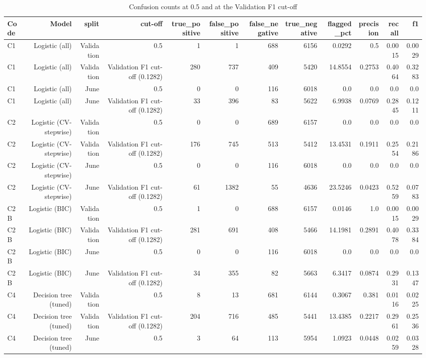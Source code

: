 \begin{table}[htbp]
\centering
\small
\caption{Confusion counts at 0.5 and at the Validation F1 cut-off}
\begin{tabular}{lrrrrrrrrrrr}
\toprule
Code & Model & split & cut-off & true\_positive & false\_positive & false\_negative & true\_negative & flagged\_pct & precision & recall & f1 \\
\midrule
C1 & Logistic (all) & Validation & 0.5 & 1 & 1 & 688 & 6156 & 0.0292 & 0.5 & 0.0015 & 0.0029 \\
C1 & Logistic (all) & Validation & Validation F1 cut-off (0.1282) & 280 & 737 & 409 & 5420 & 14.8554 & 0.2753 & 0.4064 & 0.3283 \\
C1 & Logistic (all) & June & 0.5 & 0 & 0 & 116 & 6018 & 0.0 & 0.0 & 0.0 & 0.0 \\
C1 & Logistic (all) & June & Validation F1 cut-off (0.1282) & 33 & 396 & 83 & 5622 & 6.9938 & 0.0769 & 0.2845 & 0.1211 \\
C2 & Logistic (CV-stepwise) & Validation & 0.5 & 0 & 0 & 689 & 6157 & 0.0 & 0.0 & 0.0 & 0.0 \\
C2 & Logistic (CV-stepwise) & Validation & Validation F1 cut-off (0.1282) & 176 & 745 & 513 & 5412 & 13.4531 & 0.1911 & 0.2554 & 0.2186 \\
C2 & Logistic (CV-stepwise) & June & 0.5 & 0 & 0 & 116 & 6018 & 0.0 & 0.0 & 0.0 & 0.0 \\
C2 & Logistic (CV-stepwise) & June & Validation F1 cut-off (0.1282) & 61 & 1382 & 55 & 4636 & 23.5246 & 0.0423 & 0.5259 & 0.0783 \\
C2B & Logistic (BIC) & Validation & 0.5 & 1 & 0 & 688 & 6157 & 0.0146 & 1.0 & 0.0015 & 0.0029 \\
C2B & Logistic (BIC) & Validation & Validation F1 cut-off (0.1282) & 281 & 691 & 408 & 5466 & 14.1981 & 0.2891 & 0.4078 & 0.3384 \\
C2B & Logistic (BIC) & June & 0.5 & 0 & 0 & 116 & 6018 & 0.0 & 0.0 & 0.0 & 0.0 \\
C2B & Logistic (BIC) & June & Validation F1 cut-off (0.1282) & 34 & 355 & 82 & 5663 & 6.3417 & 0.0874 & 0.2931 & 0.1347 \\
C4 & Decision tree (tuned) & Validation & 0.5 & 8 & 13 & 681 & 6144 & 0.3067 & 0.381 & 0.0116 & 0.0225 \\
C4 & Decision tree (tuned) & Validation & Validation F1 cut-off (0.1282) & 204 & 716 & 485 & 5441 & 13.4385 & 0.2217 & 0.2961 & 0.2536 \\
C4 & Decision tree (tuned) & June & 0.5 & 3 & 64 & 113 & 5954 & 1.0923 & 0.0448 & 0.0259 & 0.0328 \\

\end{tabular}
\end{table}
